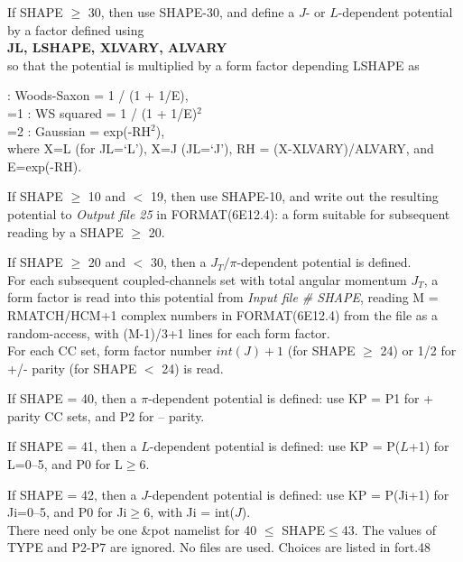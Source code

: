 \documentclass[11pt]{article}
\begin{document}
\medskip

If SHAPE $\geq$ 30, then use SHAPE-30, and define a
$J$- or  $L$-dependent potential by a factor defined
using \\
{\bf JL, LSHAPE, XLVARY, ALVARY} \\
so that the potential is multiplied by a form factor depending LSHAPE as 

 : Woods-Saxon  = 1 / (1 + 1/E), \\
      =1 : WS squared   = 1 / (1 + 1/E)$^2$\\
      =2 : Gaussian     = exp(-RH$^2$), \\
where X=L (for JL=`L'), X=J (JL=`J'),
RH = (X-XLVARY)/ALVARY, and E=exp(-RH).

\medskip

If SHAPE $\geq$ 10 and $<$ 19, then use SHAPE-10, and write out the
resulting potential to {\em Output file 25} in FORMAT(6E12.4):
a form suitable for subsequent reading by a SHAPE $\geq$ 20.

\medskip

If SHAPE $\geq$ 20 and $<$ 30, then a $J_{T}/\pi$-dependent
potential is defined.
\\
For each subsequent coupled-channels set with total angular momentum
$J_{T}$, a form factor is read into this potential from
{\em Input file \# SHAPE}, reading M = RMATCH/HCM+1 complex numbers
in FORMAT(6E12.4) from the
file as a random-access, with (M-1)/3+1 lines for each form factor.
\\
For each CC set, form factor number
$int(J)+1$ (for SHAPE $\geq$ 24) or
1/2 for +/- parity (for SHAPE $<$ 24) is read.

If SHAPE = 40, then a $\pi$-dependent potential is defined:
use KP = P1 for + parity CC sets, and P2 for -- parity.

If SHAPE = 41, then a $L$-dependent potential is defined:
use KP = P($L$+1) for L=0--5, and P0 for L$\geq$6.

If SHAPE = 42, then a $J$-dependent potential is defined:
use KP = P(Ji+1) for Ji=0--5, and P0 for Ji$\geq$6, with Ji = int($J$).
%
\\
There need only be one \&pot namelist for 40 $\leq$ SHAPE$\leq$43. The values of TYPE
and P2-P7 are ignored. No files are used. Choices are listed in fort.48

\end{document}
